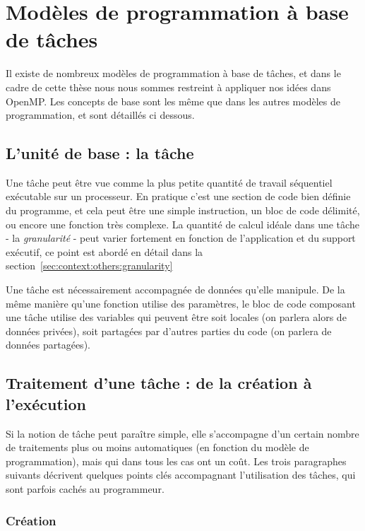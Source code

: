 \section{Modèles de programmation à base de tâches}\label{sec:context:others}

Il existe de nombreux modèles de programmation à base de tâches, et dans le cadre de cette thèse nous nous sommes restreint à appliquer nos idées dans OpenMP.
Les concepts de base sont les même que dans les autres modèles de programmation, et sont détaillés ci dessous.

\subsection{L'unité de base : la tâche}

Une tâche peut être vue comme la plus petite quantité de travail séquentiel exécutable sur un processeur.
En pratique c'est une section de code bien définie du programme, et cela peut être une simple instruction, un bloc de code délimité, ou encore une fonction très complexe.
La quantité de calcul idéale dans une tâche - la \emph{granularité} - peut varier fortement en fonction de l'application et du support exécutif, ce point est abordé en détail dans la section~\ref{sec:context:others:granularity}

Une tâche est nécessairement accompagnée de données qu'elle manipule. De la même manière qu'une fonction utilise des paramètres, le bloc de code composant une tâche utilise des variables qui peuvent être soit locales (on parlera alors de données privées), soit partagées par d'autres parties du code (on parlera de données partagées).


\subsection{Traitement d'une tâche : de la création à l'exécution}\label{sec:context:others:costs}

Si la notion de tâche peut paraître simple, elle s'accompagne d'un certain nombre de traitements plus ou moins automatiques (en fonction du modèle de programmation), mais qui dans tous les cas ont un coût.
Les trois paragraphes suivants décrivent quelques points clés accompagnant l'utilisation des tâches, qui sont parfois cachés au programmeur.

\subsubsection{Création}


